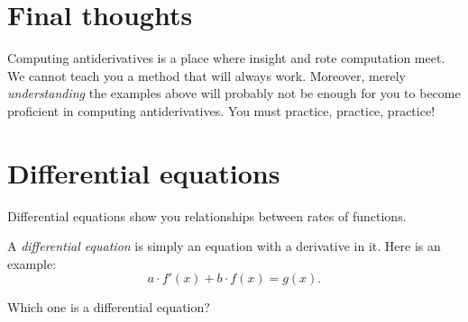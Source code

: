 \documentclass{ximera}
\begin{document}
\section{Final thoughts}
Computing antiderivatives is a place where insight and rote
computation meet. We cannot teach you a method that will always
work. Moreover, merely \emph{understanding} the examples above will
probably not be enough for you to become proficient in computing
antiderivatives. You must practice, practice, practice!

\section{Differential equations}

  Differential equations show you relationships between rates of
  functions.



A \textit{differential equation} is
simply an equation with a derivative in it. Here is an example:
\[
a\cdot f'(x)+ b\cdot f(x) = g(x).
\]
\begin{question}
 Which one is a differential equation?
  \begin{multipleChoice}
  \end{multipleChoice}
\end{question}
\end{document}
